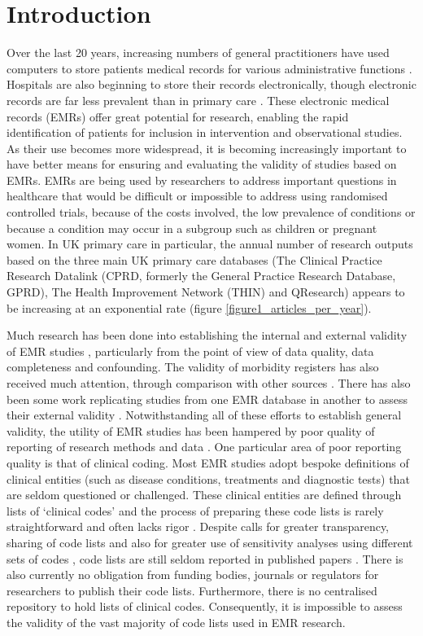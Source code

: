 \documentclass[10pt]{article}
\begin{document}
\section*{Introduction}

Over the last 20 years, increasing numbers of general practitioners have used computers to store patients medical records for various administrative functions \cite{Purves1996}. Hospitals are also beginning to store their records electronically, though electronic records are far less prevalent than in primary care \cite{Ashish2009}. These electronic medical records (EMRs) offer great potential for research, enabling the rapid identification of patients for inclusion in intervention and observational studies. As their use becomes more widespread, it is becoming increasingly important to have better means for ensuring and evaluating the validity of studies based on EMRs. EMRs are being used by researchers to address important questions in healthcare that would be difficult or impossible to address using randomised controlled trials, because of the costs involved, the low prevalence of conditions or because a condition may occur in a subgroup such as children or pregnant women. In UK primary care in particular, the annual number of research outputs based on the three main UK primary care databases (The Clinical Practice Research Datalink (CPRD, formerly the General Practice Research Database, GPRD), The Health Improvement Network (THIN) and QResearch) appears to be increasing at an exponential rate (figure \ref{figure1_articles_per_year}). 


Much research has been done into establishing the internal and external validity of EMR studies \cite{Herrett2010}, particularly from the point of view of data quality, data completeness and confounding.  The validity of morbidity registers has also received much attention, through comparison with other sources \cite{Jordan2004}. There has also been some work replicating studies from one EMR database in another to assess their external validity \cite{Hippisley-Cox2008, Vinogradova2013, Reeves2014}.  Notwithstanding all of these efforts to establish general validity, the utility of EMR studies has been hampered by poor quality of reporting of research methods and data \cite{Langan2013}. One particular area of poor reporting quality is that of clinical coding. Most EMR studies adopt bespoke definitions of clinical entities (such as disease conditions, treatments and diagnostic tests) that are seldom questioned or challenged.  These clinical entities are defined through lists of `clinical codes' and the process of preparing these code lists is rarely straightforward and often lacks rigor \cite{Dave2009}.  Despite calls for greater transparency, sharing of code lists and also for greater use of sensitivity analyses using different sets of codes \cite{Gulliford2009, Bhattarai2012}, code lists are still seldom reported in published papers \cite{Herrett2010}.  There is also currently no obligation from funding bodies, journals or regulators for researchers to publish their code lists.  Furthermore, there is no centralised repository to hold lists of clinical codes. Consequently, it is impossible to assess the validity of the vast majority of code lists used in EMR research. 
\end{document}
